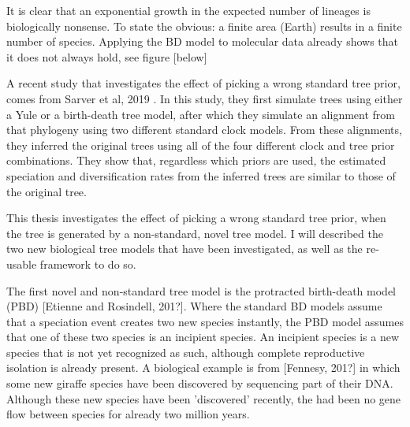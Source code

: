 It is clear that an exponential growth in the expected number of lineages
is biologically nonsense. 
To state the obvious: a finite area (Earth) results in a finite number of species. 
Applying the BD model to molecular data already shows that it does not
always hold, see figure [below]

%
%
%
%
%

%
%
%

A recent study that investigates the effect of picking
a wrong standard tree prior, comes from Sarver et al, 2019 \cite{sarver2019choice}.
In this study, they first simulate trees using either a Yule or a birth-death
tree model, after which they simulate an alignment from that phylogeny
using two different standard clock models. From these alignments, 
they inferred the original trees using all of the four 
different clock and tree prior combinations. 
They show that, regardless which priors are used,
the estimated speciation and diversification rates 
from the inferred trees are similar to those of the original tree.

This thesis investigates the effect of picking a wrong standard
tree prior, when the tree is generated by a non-standard, novel tree model.
I will described the two new biological tree models that have been
investigated, as well as the re-usable framework to do so. 

The first novel and non-standard tree model is the protracted birth-death
model (PBD) [Etienne and Rosindell, 201?].
Where the standard BD models assume that a speciation event creates
two new species instantly, the PBD model assumes that one of these two species
is an incipient species. An incipient species is a new species
that is not yet recognized as such, although complete reproductive
isolation is already present.
A biological example is from [Fennesy, 201?] in which
some new giraffe species have been discovered by sequencing
part of their DNA. Although these new species have been
'discovered' recently, the had been no gene flow between species
for already two million years.

